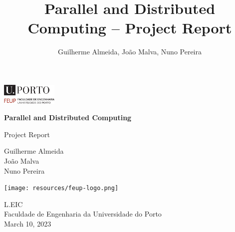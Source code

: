 \documentclass[11pt,a4paper]{article}
\title{Parallel and Distributed Computing -- \nth{1} Project Report}
\author{Guilherme Almeida, João Malva, Nuno Pereira}
\begin{document}

\begin{titlepage}
    \begin{flushleft}
        \includegraphics[width=0.2\textwidth]{resources/uporto-feup.pdf}
    \end{flushleft}
   \begin{center}
       \vspace*{2cm}

       \begin{Huge}
            \textbf{Parallel and Distributed Computing}
       \end{Huge}

       \vspace{0.5cm}

       \begin{Large}
         Project Report
       \end{Large}
       \vspace{1cm}

        \begin{center}
                Guilherme Almeida\\
                João Malva\\
                Nuno Pereira\\
        \end{center}


            
       \vspace{3cm}
     
       \texttt{[image: resources/feup-logo.png]}

       \vfill{}
            
       L.EIC\\
       Faculdade de Engenharia da Universidade do Porto\\
       March 10, 2023
            
   \end{center}
\end{titlepage}

\pagebreak

\tableofcontents
\pagebreak

\pagestyle{plain} %
\setcounter{page}{1}
\end{document}
